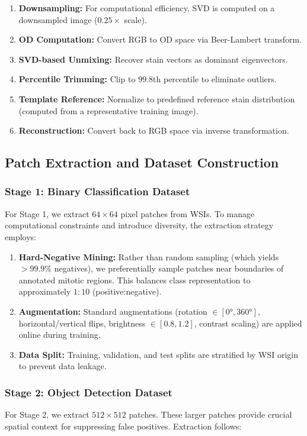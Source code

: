 \documentclass[journal]{IEEEtran}
\begin{document}
\begin{enumerate}
\item \textbf{Downsampling:} For computational efficiency, SVD is computed on a downsampled image ($0.25 \times$ scale).
\item \textbf{OD Computation:} Convert RGB to OD space via Beer-Lambert transform.
\item \textbf{SVD-based Unmixing:} Recover stain vectors as dominant eigenvectors.
\item \textbf{Percentile Trimming:} Clip to $99.8$th percentile to eliminate outliers.
\item \textbf{Template Reference:} Normalize to predefined reference stain distribution (computed from a representative training image).
\item \textbf{Reconstruction:} Convert back to RGB space via inverse transformation.
\end{enumerate}

\subsection{Patch Extraction and Dataset Construction}

\subsubsection{Stage 1: Binary Classification Dataset}
For Stage 1, we extract $64 \times 64$ pixel patches from WSIs. To manage computational constraints and introduce diversity, the extraction strategy employs:

\begin{enumerate}
\item \textbf{Hard-Negative Mining:} Rather than random sampling (which yields $>99.9\%$ negatives), we preferentially sample patches near boundaries of annotated mitotic regions. This balances class representation to approximately $1:10$ (positive:negative).
\item \textbf{Augmentation:} Standard augmentations (rotation $\in [0°, 360°]$, horizontal/vertical flips, brightness $\in [0.8, 1.2]$, contrast scaling) are applied online during training.
\item \textbf{Data Split:} Training, validation, and test splits are stratified by WSI origin to prevent data leakage.
\end{enumerate}

\subsubsection{Stage 2: Object Detection Dataset}
For Stage 2, we extract $512 \times 512$ patches. These larger patches provide crucial spatial context for suppressing false positives. Extraction follows:
\end{document}
